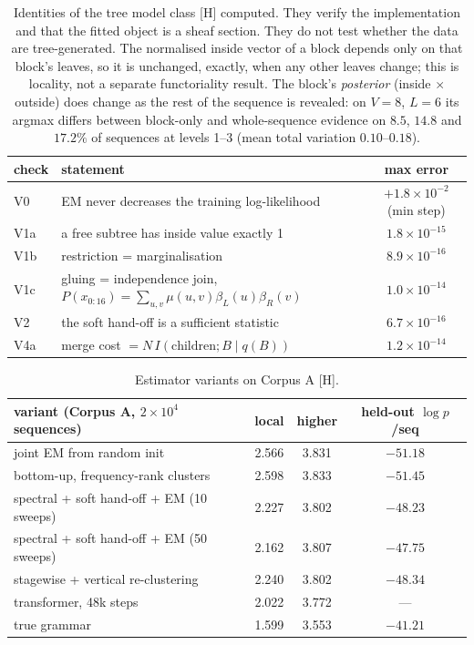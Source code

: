 \documentclass[11pt]{article}
\theoremstyle{definition}
\theoremstyle{remark}
\newcommand{\src}[1]{\textsf{\small[#1]}}
\newcommand{\st}[1]{\textsf{\small\color{gray}#1}}
\begin{document}
\begin{table}[!htbp]\centering\small
\begin{tabular}{llc}
\toprule
check & statement & max error\\
\midrule
V0 & EM never decreases the training log-likelihood & $+1.8\times10^{-2}$ (min step)\\
V1a & a free subtree has inside value exactly 1 & $1.8\times10^{-15}$\\
V1b & restriction = marginalisation & $8.9\times10^{-16}$\\
V1c & gluing = independence join, $P(x_{0:16})=\sum_{u,v}\mu(u,v)\beta_L(u)\beta_R(v)$ & $1.0\times10^{-14}$\\
V2 & the soft hand-off is a sufficient statistic & $6.7\times10^{-16}$\\
V4a & merge cost $=N\,I(\text{children};B\mid q(B))$ & $1.2\times10^{-14}$\\
\bottomrule
\end{tabular}
\caption{Identities of the tree model class \src{H} \st{computed}. They verify the implementation and that the fitted object is a sheaf section. They do not test whether the data are tree-generated. The normalised inside vector of a block depends only on that block's leaves, so it is unchanged, exactly, when any other leaves change; this is locality, not a separate functoriality result. The block's \emph{posterior} (inside $\times$ outside) does change as the rest of the sequence is revealed: on $V=8$, $L=6$ its argmax differs between block-only and whole-sequence evidence on $8.5$, $14.8$ and $17.2\%$ of sequences at levels 1--3 (mean total variation $0.10$--$0.18$).}
\label{tab:identities}
\end{table}

\begin{table}[!htbp]\centering\small
\begin{tabular}{lccc}
\toprule
variant (Corpus A, $2\times10^4$ sequences) & local & higher & held-out $\log p$/seq\\
\midrule
joint EM from random init & 2.566 & 3.831 & $-51.18$\\
bottom-up, frequency-rank clusters & 2.598 & 3.833 & $-51.45$\\
spectral + soft hand-off + EM (10 sweeps) & 2.227 & 3.802 & $-48.23$\\
spectral + soft hand-off + EM (50 sweeps) & 2.162 & 3.807 & $-47.75$\\
stagewise + vertical re-clustering & 2.240 & 3.802 & $-48.34$\\
\midrule
transformer, 48k steps & 2.022 & 3.772 & ---\\
true grammar & 1.599 & 3.553 & $-41.21$\\
\bottomrule
\end{tabular}
\caption{Estimator variants on Corpus A \src{H}.}
\end{table}
\end{document}
